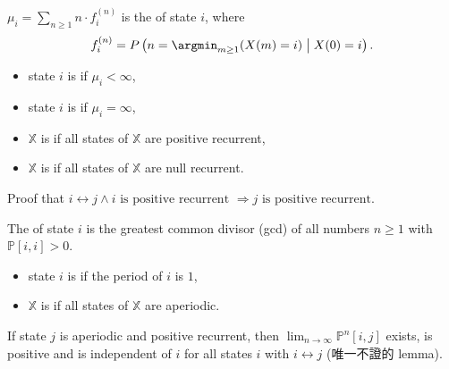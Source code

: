 \begin{definition}
$ \mu_{i} = \sum_{n \ge 1} n \cdot f_{i}^{(n)} $ is the  of state $ i $, where 
\[ f_{i}^{(n)} = P \left( n = \argmin_{m \ge 1} ( X(m) = i ) \;\middle|\; X(0) = i \right). \]

\begin{itemize}
  \item state $ i $ is  if $ \mu_{i} < \infty $,
  \item state $ i $ is  if $ \mu_{i} = \infty $,
  \item $ \mathbb{X} $ is  if all states of $ \mathbb{X} $ are positive recurrent,
  \item $ \mathbb{X} $ is  if all states of $ \mathbb{X} $ are null recurrent.
\end{itemize}

\begin{comment}
\[ f_{i} = \sum_{n = 0}^{\infty} f_{i}^{(n)} = \text{recurrent probability of state $ i $}. \]
\end{comment}
\end{definition}

\begin{exercise}
Proof that $ i \leftrightarrow j \wedge i \text{ is positive recurrent } \Rightarrow j \text{ is positive recurrent}. $
\end{exercise}

\begin{definition}
The  of state $ i $ is the greatest common divisor (gcd) of all numbers $ n \ge 1 $ with $ \mathbb{P}[i, i] > 0 $.

\begin{itemize}
  \item state $ i $ is  if the period of $ i $ is $ 1 $,
  \item $ \mathbb{X} $ is  if all states of $ \mathbb{X} $ are aperiodic.
\end{itemize}
\end{definition}

\begin{lemma} \label{lem:lim-p_nij-exists}
If state $ j $ is aperiodic and positive recurrent, then $ \lim_{n \to \infty} \mathbb{P}^{n}[i, j] $ exists, is positive and is independent of $ i $ for all states $ i $ with $ i \leftrightarrow j $ (唯一不證的 lemma).

\begin{comment}
In general, if $ d $ is the period of $ j $, then
\[ \lim_{t \to \infty} \mathbb{P}^{td}[i, j] = \frac{d}{\mu_{i}} \]
\end{comment}
\end{lemma}

